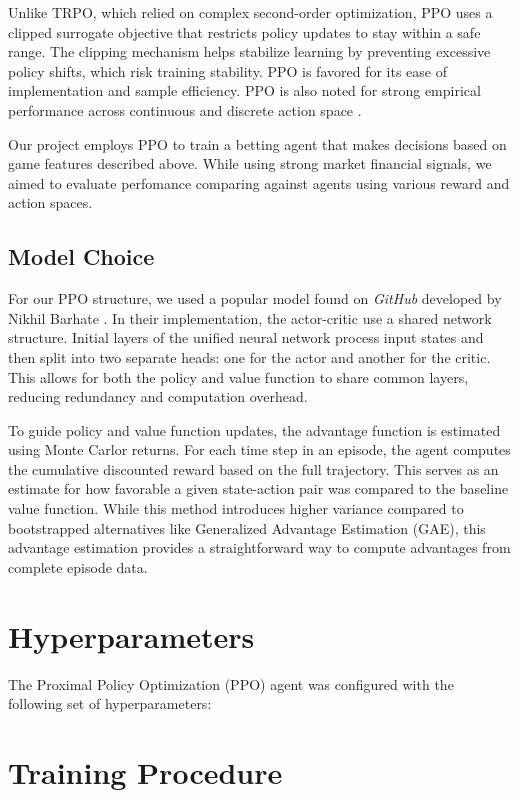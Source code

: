 \documentclass[sigconf]{acmart}
\begin{document}
Unlike TRPO, which relied on complex second-order optimization, PPO uses a clipped surrogate objective that restricts policy updates to stay within a safe range. The clipping mechanism helps stabilize learning by preventing excessive policy shifts, which risk training stability. PPO is favored for its ease of implementation and sample efficiency. PPO is also noted for strong empirical performance across continuous and discrete action space \cite{schulman2017proximalpolicyoptimizationalgorithms}.

Our project employs PPO to train a betting agent that makes decisions based on game features described above. While using strong market financial signals, we aimed to evaluate perfomance comparing against agents using various reward and action spaces.

\subsection{Model Choice}

   For our PPO structure, we used a popular model found on \textit{GitHub} developed by Nikhil Barhate \cite{barhate2020ppo}. In their implementation, the actor-critic use a shared network structure. Initial layers of the unified neural network process input states and then split into two separate heads: one for the actor and another for the critic. This allows for both the policy and value function to share common layers, reducing redundancy and computation overhead.

   To guide policy and value function updates, the advantage function is estimated using Monte Carlor returns. For each time step in an episode, the agent computes the cumulative discounted reward based on the full trajectory. This serves as an estimate for how favorable a given state-action pair was compared to the baseline value function. While this method introduces higher variance compared to bootstrapped alternatives like Generalized Advantage Estimation (GAE), this advantage estimation provides a straightforward way to compute advantages from complete episode data. 

\section{Hyperparameters}\label{sec:hyperparameters}

The Proximal Policy Optimization (PPO) agent was configured with the following set of hyperparameters:


\section{Training Procedure}
\end{document}

